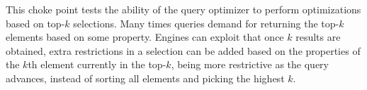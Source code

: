 
This choke point tests the ability of the query optimizer to perform
optimizations based on top-$k$ selections. Many times queries demand for
returning the top-$k$ elements based on some property. Engines can exploit that
once $k$ results are obtained, extra restrictions in a selection can be added
based on the properties of the $k$th element currently in the top-$k$, being
more restrictive as the query advances, instead of sorting all elements and
picking the highest $k$.


